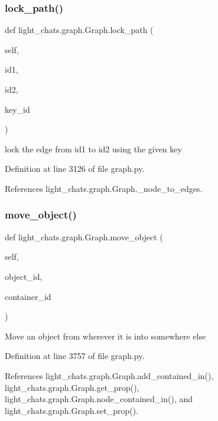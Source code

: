 \subsubsection{\texorpdfstring{lock\+\_\+path()}{lock\_path()}}
{\footnotesize\ttfamily def light\+\_\+chats.\+graph.\+Graph.\+lock\+\_\+path (\begin{DoxyParamCaption}\item[{}]{self,  }\item[{}]{id1,  }\item[{}]{id2,  }\item[{}]{key\+\_\+id }\end{DoxyParamCaption})}

\begin{DoxyVerb}lock the edge from id1 to id2 using the given key\end{DoxyVerb}
 

Definition at line 3126 of file graph.\+py.



References light\+\_\+chats.\+graph.\+Graph.\+\_\+node\+\_\+to\+\_\+edges.

\mbox{\label{classlight__chats_1_1graph_1_1Graph_a8a92252320777766ddab522549671f43}} 
\subsubsection{\texorpdfstring{move\+\_\+object()}{move\_object()}}
{\footnotesize\ttfamily def light\+\_\+chats.\+graph.\+Graph.\+move\+\_\+object (\begin{DoxyParamCaption}\item[{}]{self,  }\item[{}]{object\+\_\+id,  }\item[{}]{container\+\_\+id }\end{DoxyParamCaption})}

\begin{DoxyVerb}Move an object from wherever it is into somewhere else\end{DoxyVerb}
 

Definition at line 3757 of file graph.\+py.



References light\+\_\+chats.\+graph.\+Graph.\+add\+\_\+contained\+\_\+in(), light\+\_\+chats.\+graph.\+Graph.\+get\+\_\+prop(), light\+\_\+chats.\+graph.\+Graph.\+node\+\_\+contained\+\_\+in(), and light\+\_\+chats.\+graph.\+Graph.\+set\+\_\+prop().



